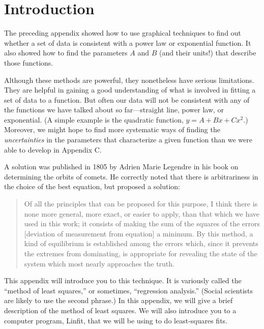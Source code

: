 \newapp
\label{compassis}
\vspace{-.5in}
\section*{Introduction}

The preceding appendix showed how to use graphical techniques to find
out whether a set of data is consistent with a power law or
exponential function.  It also showed how to find the parameters $A$
and $B$ (and their units!) that describe those functions.

Although these methods are powerful, they nonetheless have serious
limitations.  They are helpful in gaining
a good understanding of what is involved in fitting a set of data to a
function.  But often our data will not be consistent with any of the
functions we have talked about so far---straight line, power law, or
exponential.  (A simple example is the quadratic function, $y = A
+ B x + C x^2$.)  Moreover, we might hope to find more systematic ways
of
finding the {\em uncertainties} in the parameters that characterize a
given function than we were able to develop in Appendix C.

A solution was published in 1805 by Adrien Marie Legendre in his book 
on determining the orbits of comets. He correctly noted that there is 
arbitrariness in the choice of the best equation, but proposed a solution:
%

\begin{quote}
Of all the principles that can be proposed for this purpose, I think there 
is none more general, more exact, or easier to apply, than that which we have 
used in this work; it consists of making the sum of the squares of the errors 
[deviation of measurement from equation] a minimum. By this method, a kind of 
equilibrium is established among the errors which, since it prevents the extremes 
from dominating, is appropriate for revealing the state of the system which most 
nearly approaches the truth.
\parskip=0pt
\end{quote}

This appendix will introduce you to this technique.
It is variously called the ``method of least squares,'' or
sometimes, ``regression analysis.''  (Social scientists are likely to
use the second phrase.)  In this appendix, we will give a brief
description of the method of least squares.  We will also introduce
you to a computer program, Linfit, that we will be using to do
least-squares fits.

